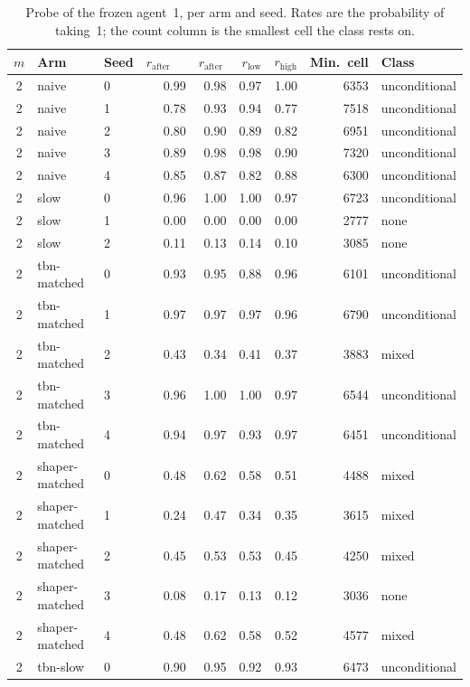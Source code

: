 \begin{table}[ht]
\centering\small
\caption{Probe of the frozen agent~1, per arm and seed. Rates are the probability of taking~1; the count column is the smallest cell the class rests on.}
\label{tab:classes}
\begin{tabular}{cllrrrrrl}
\toprule
$m$ & Arm & Seed & $r_{\text{after restrain}}$ & $r_{\text{after take}}$ & $r_{\text{low}}$ & $r_{\text{high}}$ & Min.\ cell & Class \\
\midrule
2 & naive & 0 & 0.99 & 0.98 & 0.97 & 1.00 & 6353 & unconditional \\
2 & naive & 1 & 0.78 & 0.93 & 0.94 & 0.77 & 7518 & unconditional \\
2 & naive & 2 & 0.80 & 0.90 & 0.89 & 0.82 & 6951 & unconditional \\
2 & naive & 3 & 0.89 & 0.98 & 0.98 & 0.90 & 7320 & unconditional \\
2 & naive & 4 & 0.85 & 0.87 & 0.82 & 0.88 & 6300 & unconditional \\
2 & slow & 0 & 0.96 & 1.00 & 1.00 & 0.97 & 6723 & unconditional \\
2 & slow & 1 & 0.00 & 0.00 & 0.00 & 0.00 & 2777 & none \\
2 & slow & 2 & 0.11 & 0.13 & 0.14 & 0.10 & 3085 & none \\
2 & tbn-matched & 0 & 0.93 & 0.95 & 0.88 & 0.96 & 6101 & unconditional \\
2 & tbn-matched & 1 & 0.97 & 0.97 & 0.97 & 0.96 & 6790 & unconditional \\
2 & tbn-matched & 2 & 0.43 & 0.34 & 0.41 & 0.37 & 3883 & mixed \\
2 & tbn-matched & 3 & 0.96 & 1.00 & 1.00 & 0.97 & 6544 & unconditional \\
2 & tbn-matched & 4 & 0.94 & 0.97 & 0.93 & 0.97 & 6451 & unconditional \\
2 & shaper-matched & 0 & 0.48 & 0.62 & 0.58 & 0.51 & 4488 & mixed \\
2 & shaper-matched & 1 & 0.24 & 0.47 & 0.34 & 0.35 & 3615 & mixed \\
2 & shaper-matched & 2 & 0.45 & 0.53 & 0.53 & 0.45 & 4250 & mixed \\
2 & shaper-matched & 3 & 0.08 & 0.17 & 0.13 & 0.12 & 3036 & none \\
2 & shaper-matched & 4 & 0.48 & 0.62 & 0.58 & 0.52 & 4577 & mixed \\
2 & tbn-slow & 0 & 0.90 & 0.95 & 0.92 & 0.93 & 6473 & unconditional \\

\end{tabular}
\end{table}

